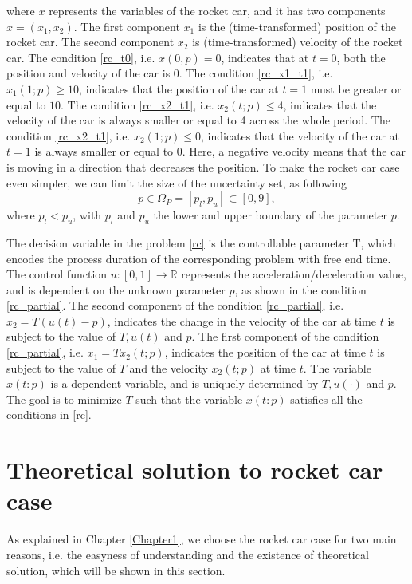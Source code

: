 	where $x$ represents the variables of the rocket car, and it has two components $ x = (x_1, x_2)$. The first component $x_1$ is the (time-transformed) position of the rocket car. The second component $x_2$ is (time-transformed) velocity of the rocket car. The condition \ref{rc_t0}, i.e. $x(0,p) = 0$, indicates that at $t=0$, both the position and velocity of the car is $0$. The condition \ref{rc_x1_t1}, i.e. $x_1(1;p) \geq 10$, indicates that the position of the car at $t=1$ must be greater or equal to $10$. The condition \ref{rc_x2_t1}, i.e. $x_2(t;p) \leq 4$, indicates that the velocity of the car is always smaller or equal to 4 across the whole period. The condition \ref{rc_x2_t1}, i.e. $x_2(1;p) \leq 0$, indicates that the velocity of the car at $t=1$ is always smaller or equal to $0$. Here, a negative velocity means that the car is moving in a direction that decreases the position. To make the rocket car case even simpler, we can limit the size of the uncertainty set, as following
	\begin{equation}
		p \in \Omega_P = [p_l, p_u] \subset [0,9],
	\end{equation}
	where $p_l < p_u$, with $p_l$ and $p_u$ the lower and upper boundary of the parameter $p$.  
	
	The decision variable in the problem \ref{rc} is the controllable parameter T, which encodes the process duration of the corresponding problem with free end time. The control function $ u: [0,1] \rightarrow \mathbb{R}$ represents the acceleration/deceleration value, and is dependent on the unknown parameter $p$, as shown in the condition \ref{rc_partial}. The second component of the condition \ref{rc_partial}, i.e. $\dot{x_2} = T (u(t)-p)$, indicates the change in the velocity of the car at time $t$ is subject to the value of $T, u(t)$ and $p$. The first component of the condition \ref{rc_partial}, i.e. $\dot{x_1} = Tx_2(t;p)$, indicates the position of the car at time $t$ is subject to the value of $T$ and the velocity $x_2(t;p)$ at time $t$. The variable $x(t:p)$ is a dependent variable, and is uniquely determined by $T, u(\cdot)$ and $p$. The goal is to minimize $T$ such that the variable $x(t:p)$ satisfies all the conditions in \ref{rc}. 
	
	\section{Theoretical solution to rocket car case}
	As explained in Chapter \ref{Chapter1}, we choose the rocket car case for two main reasons, i.e. the easyness of understanding and the existence of theoretical solution, which will be shown in this section. 
	
